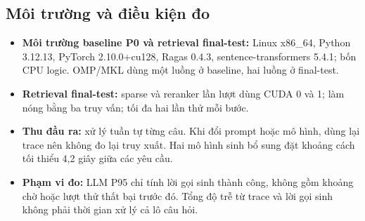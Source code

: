 \subsection{Môi trường và điều kiện đo}
\begin{itemize}
\item \textbf{Môi trường baseline P0 và retrieval final-test:} Linux x86\_64, Python 3.12.13, PyTorch 2.10.0+cu128, Ragas 0.4.3, sentence-transformers 5.4.1; bốn CPU logic. OMP/MKL dùng một luồng ở baseline, hai luồng ở final-test.
\item \textbf{Retrieval final-test:} sparse và reranker lần lượt dùng CUDA 0 và 1; làm nóng bằng ba truy vấn; tối đa hai lần thử mỗi bước.
\item \textbf{Thu đầu ra:} xử lý tuần tự từng câu. Khi đổi prompt hoặc mô hình, dùng lại trace nên không đo lại truy xuất. Hai mô hình sinh bổ sung đặt khoảng cách tối thiểu 4,2 giây giữa các yêu cầu.
\item \textbf{Phạm vi đo:} LLM P95 chỉ tính lời gọi sinh thành công, không gồm khoảng chờ hoặc lượt thử thất bại trước đó. Tổng độ trễ từ trace và lời gọi sinh không phải thời gian xử lý cả lô câu hỏi.
\end{itemize}
